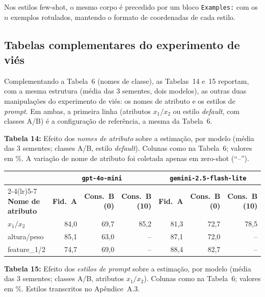 \documentclass[12pt,a4paper]{article}
\begin{document}
Nos estilos few-shot, o mesmo corpo é precedido por um bloco \texttt{Examples:} com os $n$
exemplos rotulados, mantendo o formato de coordenadas de cada estilo.

\subsection{Tabelas complementares do experimento de viés}
\label{ap:bias_tabelas}

Complementando a Tabela~6 (nomes de classe), as
Tabelas~14 e~15 reportam, com a mesma estrutura
(média das $3$ sementes, dois modelos), as outras duas manipulações do experimento de
viés: os nomes de atributo e os estilos de \emph{prompt}. Em ambas, a primeira linha
(atributos $x_1/x_2$ ou estilo \emph{default}, com classes A/B) é a configuração de
referência, a mesma da Tabela~6.


\bigskip

\noindent \textbf{Tabela 14:} Efeito dos \emph{nomes de atributo} sobre a estimação, por modelo (média das $3$
sementes; classes A/B, estilo \emph{default}). Colunas como na Tabela~6;
valores em \%. A variação de nome de atributo foi coletada apenas em zero-shot (``--'').

\begin{tabular}{lrrrrrr}
\toprule
& \multicolumn{3}{c}{\textbf{\texttt{gpt-4o-mini}}} &
\multicolumn{3}{c}{\textbf{\texttt{gemini-2.5-flash-lite}}} \\
\cmidrule(lr){2-4}\cmidrule(lr){5-7}
\textbf{Nome de atributo} & \textbf{Fid.\ A} & \textbf{Cons.\ B (0)} &
\textbf{Cons.\ B (10)} &
\textbf{Fid.\ A} & \textbf{Cons.\ B (0)} & \textbf{Cons.\ B (10)} \\
\midrule
$x_1/x_2$    & 84,0 & 69,7 & 85,2 & 81,3 & 72,7 & 78,5 \\
altura/peso  & 85,1 & 63,0 & --   & 87,1 & 72,0 & --   \\
feature\_1/2 & 74,7 & 69,0 & --   & 88,4 & 82,7 & --   \\
\bottomrule
\end{tabular}

\bigskip



\bigskip

\noindent \textbf{Tabela 15:} Efeito dos \emph{estilos de prompt} sobre a estimação, por modelo (média das $3$
sementes; classes A/B, atributos $x_1/x_2$). Colunas como na Tabela~6;
valores em \%. Estilos transcritos no Apêndice~A.3.
\end{document}
